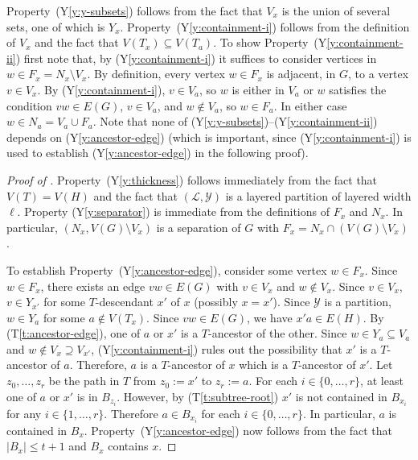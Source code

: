 \documentclass{patmorin}
\newcommand{\tref}[1]{(T\ref{t:#1})}
\newcommand{\yref}[1]{(Y\ref{y:#1})}
\renewcommand{\le}{\leqslant}
\begin{document}
Property~\yref{y-subsets} follows from the fact that $V_x$ is the union of several sets, one of which is $Y_x$.  Property~\yref{containment-i} follows from the definition of $V_x$ and the fact that $V(T_x)\subseteq V(T_a)$. To show Property~\yref{containment-ii} first note that, by \yref{containment-i} it suffices to consider vertices in $w\in F_x=N_x\setminus V_x$. By definition, every vertex $w\in F_x$ is adjacent, in $G$, to a vertex $v\in V_x$.  By \yref{containment-i}, $v\in V_a$, so $w$ is either in $V_a$ or $w$ satisfies the condition $vw\in E(G)$, $v\in V_a$, and $w\not\in V_a$, so $w\in F_a$.  In either case $w\in N_a=V_a\cup F_a$.  Note that none of \yref{y-subsets}--\yref{containment-ii} depends on \yref{ancestor-edge} (which is important, since \yref{containment-i} is used to establish \yref{ancestor-edge} in the following proof).

\begin{proof}[Proof of ]
  Property~\yref{thickness} follows immediately from the fact that $V(T)=V(H)$ and the fact that $(\mathcal{L},\mathcal{Y})$ is a layered partition of layered width $\ell$.  Property \yref{separator} is immediate from the definitions of $F_x$ and $N_x$.  In particular, $(N_x,V(G)\setminus V_x)$ is a separation of $G$ with $F_x=N_x\cap(V(G)\setminus V_x)$. 

  To establish Property~\yref{ancestor-edge}, consider some vertex $w\in F_x$.  Since $w\in F_x$, there exists an edge $vw\in E(G)$ with $v\in V_x$ and $w\not\in V_x$.  Since $v\in V_x$, $v\in Y_{x'}$ for some $T$-descendant $x'$ of $x$ (possibly $x=x'$). Since $\mathcal{Y}$ is a partition, $w\in Y_{a}$ for some $a\not\in V(T_x)$.  Since $vw\in E(G)$, we have $x'a\in E(H)$.  By \tref{ancestor-edge}, one of $a$ or $x'$ is a $T$-ancestor of the other. Since $w\in Y_a\subseteq V_a$ and $w\not\in V_x\supseteq V_{x'}$, \yref{containment-i} rules out the possibility that $x'$ is a $T$-ancestor of $a$. Therefore, $a$ is a $T$-ancestor of $x$ which is a $T$-ancestor of $x'$.  Let $z_0,\ldots,z_r$ be the path in $T$ from $z_0:=x'$ to $z_r:=a$.  For each $i\in\{0,\ldots,r\}$, at least one of $a$ or $x'$ is in $B_{z_i}$.  However, by \tref{subtree-root} $x'$ is not contained in $B_{x_i}$ for any $i\in\{1,\ldots,r\}$.  Therefore $a\in B_{x_i}$ for each $i\in\{0,\ldots,r\}$.  In particular, $a$ is contained in $B_x$.
  Property~\yref{ancestor-edge} now follows from the fact that $|B_x|\le t+1$ and $B_x$ contains $x$.
\end{proof}
\end{document}
